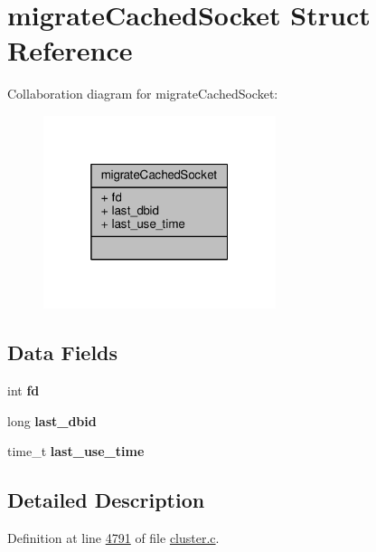 \hypertarget{structmigrateCachedSocket}{}\section{migrate\+Cached\+Socket Struct Reference}
\label{structmigrateCachedSocket}


Collaboration diagram for migrate\+Cached\+Socket\+:\nopagebreak
\begin{figure}[H]
\begin{center}
\leavevmode
\includegraphics[width=193pt]{structmigrateCachedSocket__coll__graph}
\end{center}
\end{figure}
\subsection*{Data Fields}
\begin{DoxyCompactItemize}
\item 
\mbox{\label{structmigrateCachedSocket_ad5eabf9f28e4efefc5eee6bc98f196b2}} 
int {\bfseries fd}
\item 
\mbox{\label{structmigrateCachedSocket_ae8fffd93c2175020f222656b75348299}} 
long {\bfseries last\+\_\+dbid}
\item 
\mbox{\label{structmigrateCachedSocket_a4f549c4b0f125417278e0cd832e97963}} 
time\+\_\+t {\bfseries last\+\_\+use\+\_\+time}
\end{DoxyCompactItemize}


\subsection{Detailed Description}


Definition at line \hyperlink{cluster_8c_source_l04791}{4791} of file \hyperlink{cluster_8c_source}{cluster.\+c}.



